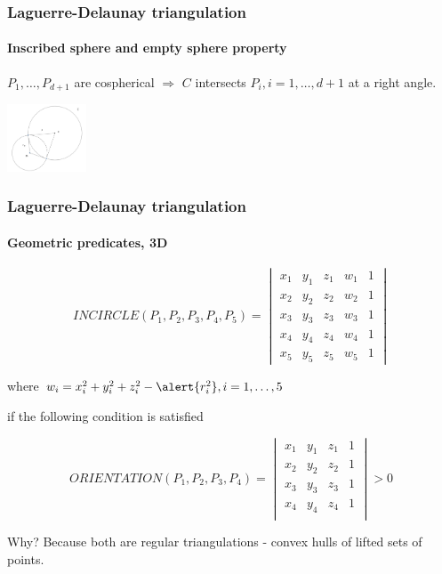 \documentclass[c, 10pt]{beamer}
\begin{document}
\begin{frame}\frametitle{Laguerre-Delaunay triangulation}\framesubtitle{Inscribed sphere and empty sphere property}
\begin{small}


$P_1, \dots, P_{d+1}$ are cospherical $\Rightarrow$ $C$ intersects $P_i, i=1,\dots,d+1$ at a right angle.

\end{small}
\begin{center}
\includegraphics[height = 2cm]{./FigureLayout/inscribedsphere.png}
\end{center}
\end{frame}


\begin{frame}\frametitle{Laguerre-Delaunay triangulation}\framesubtitle{Geometric predicates, 3D}

$$INCIRCLE(P_1,P_2,P_3,P_4, P_5) = \begin{vmatrix} x_1 & y_1 & z_1 & w_1 & 1 \\
x_2 & y_2 & z_2 & w_2 & 1 \\
x_3 & y_3 & z_3 & w_3 & 1 \\
x_4 & y_4 & z_4 & w_4 & 1 \\
x_5 & y_5 & z_5 & w_5 & 1\end{vmatrix}$$

where $w_i = x_i^2  + y_i^2 + z_i^2 - \alert{r_i^2}, i = 1,\dots, 5$

if the following condition is satisfied

$$ORIENTATION(P_1,P_2,P_3,P_4) = 
\begin{vmatrix} 
x_1 & y_1 & z_1 & 1 \\
x_2 & y_2 & z_2 & 1 \\
x_3 & y_3 & z_3 & 1 \\
x_4 & y_4 & z_4 & 1 \\
\end{vmatrix} > 0$$

Why? Because both are \alert{regular triangulations} - convex hulls of lifted sets of points.

\end{frame}
\end{document}

